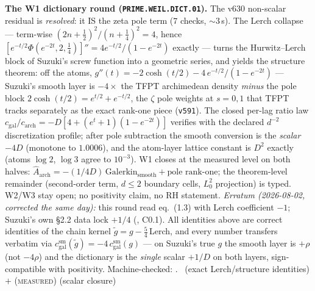 \par\smallskip\noindent\textbf{The W1 dictionary round
(\texttt{PRIME.WEIL.DICT.01}).}
The v630 non-scalar residual is \emph{resolved}: it IS the zeta pole
term ($7$ checks, ${\sim}3$\,s).  The Lerch collapse --- term-wise
$(2n{+}\tfrac12)^2/(n{+}\tfrac14)^2=4$, hence
$[e^{-t/2}\Phi(e^{-2t},2,\tfrac14)]''=4e^{-t/2}/(1-e^{-2t})$ exactly
--- turns the Hurwitz--Lerch block of Suzuki's screw function into a
geometric series, and yields the structure theorem: off the atoms,
$g''(t)=-2\cosh(t/2)-4\,e^{-t/2}/(1-e^{-2t})$ --- Suzuki's smooth
layer is $-4\times$ the TFPT archimedean density \emph{minus} the pole
block $2\cosh(t/2)=e^{t/2}+e^{-t/2}$, the $\zeta$ pole weights at
$s=0,1$ that TFPT tracks separately as the exact rank-one piece
(\texttt{v591}).  The closed per-lag ratio law
$c_{\mathrm{gal}}/c_{\mathrm{arch}}=-D[4+(e^t{+}1)(1-e^{-2t})]$
verifies with the declared $d^{-2}$ discretization profile; after pole
subtraction the smooth conversion is the \emph{scalar} $-4D$
(monotone to $1.0006$), and the atom-layer lattice constant is $D^2$
exactly (atoms $\log2$, $\log3$ agree to $10^{-3}$).  W1 closes at the
measured level on both halves:
$\widehat A_{\mathrm{arch}}=-(1/4D)\,\mathrm{Galerkin}_{\mathrm{smooth}}
+\text{pole rank-one}$; the theorem-level remainder (second-order
term, $d\le2$ boundary cells, $L^2_0$ projection) is typed.  W2/W3
stay open; no positivity claim, no RH statement.
\emph{Erratum (2026-08-02, corrected the same day):} this round read
eq.~(1.3) with Lerch coefficient $-1$; Suzuki's own \S2.2 data lock
$+1/4$ (, C0.1).  All identities above are
correct identities of the chain kernel
$\tilde g=g-\tfrac54\,$Lerch, and every number transfers verbatim via
$c^{\mathrm{sm}}_{\mathrm{gal}}(\tilde g)=-4\,c^{\mathrm{sm}}_{\mathrm{gal}}(g)$
--- on Suzuki's true $g$ the smooth layer is $+\rho$ (not $-4\rho$)
and the dictionary is the \emph{single} scalar $+1/D$ on both layers,
sign-compatible with positivity.
Machine-checked: .
\mE\ (exact Lerch/structure identities) $+$ (\textsc{measured})
(scalar closure)
\par\smallskip


